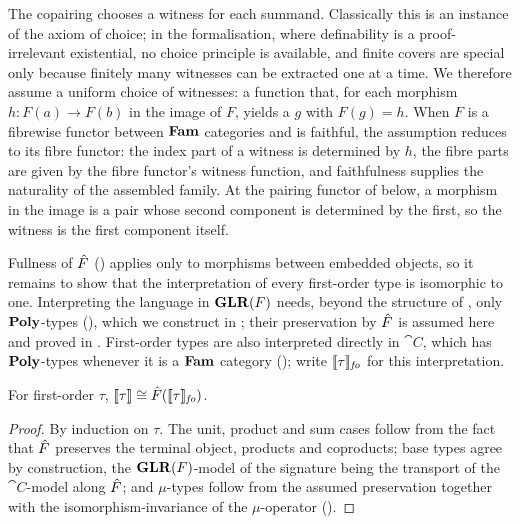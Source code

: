 The copairing chooses a witness for each summand. Classically this is an instance of the axiom
of choice; in the formalisation, where definability is a proof-irrelevant existential, no choice
principle is available, and finite covers are special only because finitely many witnesses can
be extracted one at a time. We therefore assume a uniform choice of witnesses: a function that,
for each morphism $h : F(a) \to F(b)$ in the image of $F$, yields a $g$ with $F(g) = h$. When
$F$ is a fibrewise functor between $\mathbf{Fam}$ categories and is faithful, the assumption reduces to
its fibre functor: the index part of a witness is determined by $h$, the fibre parts are given
by the fibre functor's witness function, and faithfulness supplies the naturality of the
assembled family. At the pairing functor of  below, a
morphism in the image is a pair whose second component is determined by the first, so the witness
is the first component itself.

Fullness of $\hat{F}$ () applies only to morphisms between embedded
objects, so it remains to show that the interpretation of every first-order type is isomorphic to
one. Interpreting the language in $\mathbf{GLR}(F)$ needs, beyond the structure of
, only $\mathbf{Poly}$-types (), which we
construct in ; their preservation by $\hat{F}$ is assumed here and
proved in . First-order types are also
interpreted directly in $\cat{C}$, which has $\mathbf{Poly}$-types whenever it is a $\mathbf{Fam}$ category
(); write $\llbracket \tau \rrbracket_{\mathit{fo}}$ for this interpretation.

\begin{lemma}
\label{lem:conservativity:type-agreement}
For first-order $\tau$, $\llbracket \tau \rrbracket \cong \hat{F}(\llbracket \tau \rrbracket_{\mathit{fo}})$.
\end{lemma}

\begin{proof}
By induction on $\tau$. The unit, product and sum cases follow from the fact that $\hat{F}$ preserves
the terminal object, products and coproducts; base types agree by construction, the $\mathbf{GLR}(F)$-model of
the signature being the transport of the $\cat{C}$-model along $\hat{F}$; and $\mu$-types follow from
the assumed preservation together with the isomorphism-invariance of the $\mu$-operator
().
\end{proof}

